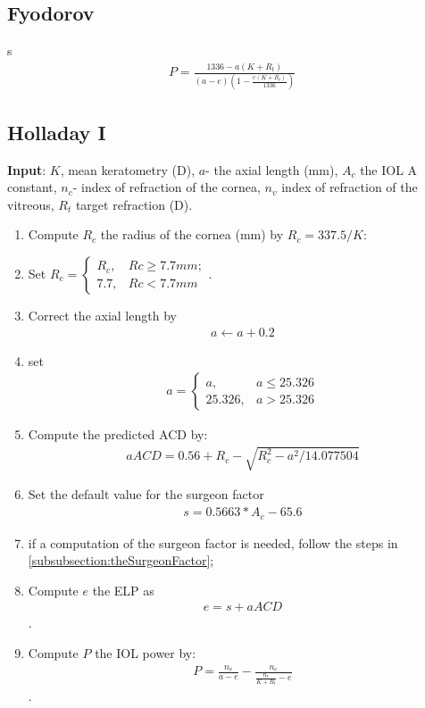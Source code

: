 \documentclass[article,twocolumn,preprint,10pt]{paper}%
\renewcommand{\(}{\left(}
\renewcommand{\)}{\right)}
\renewcommand{\[}{\left[}
\renewcommand{\]}{\right]}
\newcommand{\beq}{\begin{eqnarray}}
\newcommand{\eeq}{\end{eqnarray}}
\newcommand{\1}{\mbox{\boldmath$1$}}
\begin{document}
\subsection{Fyodorov}\label{subsection:Fyodorov}s
\beq 
P  = \frac{1336-a(K+R_t)}{(a-e)\left(1-\frac{e(K+R_t)}{1336}\right)}
\eeq 


\subsection{Holladay I}\label{subsection:Hollady1}
\textbf{Input}: $K$, mean keratometry (D), $a$- the axial length (mm), $A_c$ the IOL A constant, $n_c$- index of refraction of the cornea, $n_v$ index of refraction of the vitreous, $R_t$ target refraction (D).
\begin{enumerate}	
	\item Compute $R_c$ the radius of the cornea (mm) by $R_c=337.5/K$:
	\item Set $R_c = \begin{cases}R_c, & Rc\geq 7.7mm;\\
	7.7, & Rc<7.7mm \end{cases}$.
	\item Correct the axial length by \beq a\leftarrow a+0.2 \nonumber \eeq
	\item set \beq a= \begin{cases}a, & a\leq 25.326\\25.326, & a>25.326\end{cases}\eeq
	\item Compute the predicted ACD by:
	\beq aACD=0.56+R_c-\sqrt{R_c^2-a^2/14.077504} \nonumber\eeq 
	\item Set the default value for the surgeon factor \beq s=0.5663*A_c-65.6 \nonumber \eeq
	\item if a computation of the surgeon factor is needed, follow the steps in \ref{subsubsection:theSurgeonFactor};
	\item Compute $e$ the ELP as \beq e=s+aACD \nonumber \eeq.
	\item Compute $P$ the IOL power by:
	\beq P= \frac{n_v}{a-e}-\frac{n_c}{\frac{n_c}{K+R_t}-e} \eeq.
\end{enumerate}
\end{document}

